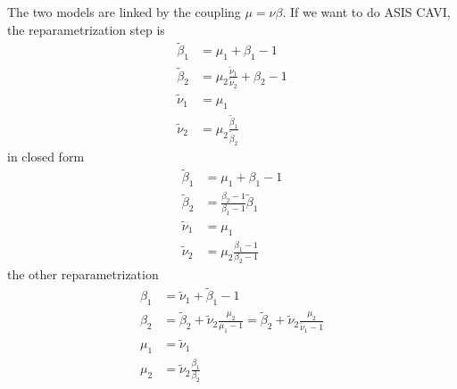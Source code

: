 \documentclass{article}
\begin{document}
\newpage

\noindent The two models are linked by the coupling $\mu = \nu\beta$. If we want to do ASIS CAVI, the reparametrization step is 
\begin{align}
\widetilde\beta_1 
&=  \mu_1 + \beta_1 - 1 \\
\widetilde\beta_2
&=  \mu_2\frac{\widetilde\nu_1}{\widetilde\nu_2} + \beta_2 - 1 \\
\widetilde\nu_1
&= \mu_1 \\
\widetilde\nu_2
&=\mu_2 \frac{\widetilde\beta_1}{\widetilde\beta_2}
\end{align}
in closed form
\
\begin{align}
\widetilde\beta_1 
&=  \mu_1 + \beta_1 - 1 \\
\widetilde\beta_2
&=  \frac{\beta_2 - 1}{\beta_1 - 1}\widetilde\beta_1 \\
\widetilde\nu_1
&= \mu_1 \\
\widetilde\nu_2
&=\mu_2 \frac{\beta_1 - 1}{\beta_2 - 1}
\end{align}
the other reparametrization
\begin{align}
\beta_1 
&= \widetilde\nu_1 + \widetilde\beta_1 - 1 \\
\beta_2 
&= \widetilde\beta_2 + \widetilde\nu_2 \frac{\mu_2}{\mu_1-1}
= \widetilde\beta_2 + \widetilde\nu_2 \frac{\mu_2}{\widetilde\nu_1-1}
 \\
\mu_1
&= \widetilde\nu_1 \\
\mu_2
&= \widetilde\nu_2\frac{\beta_1}{\beta_2}
\end{align}
\end{document}
